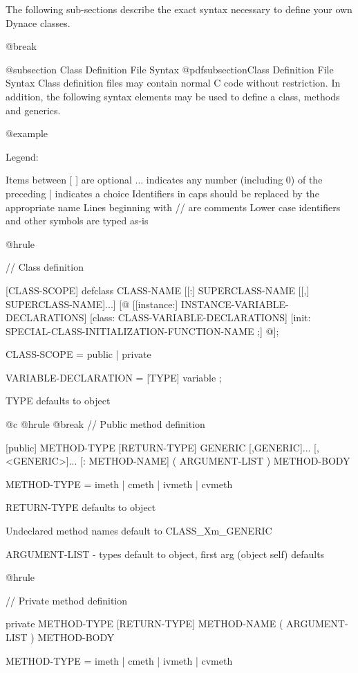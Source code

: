The following sub-sections describe the exact syntax
necessary to define your own Dynace classes.

@break

@subsection Class Definition File Syntax
@pdfsubsection{Class Definition File Syntax}
Class definition files may contain normal C code without restriction.
In addition, the following syntax elements may be used to define a class,
methods and generics.


@example

Legend:

        Items between [ ] are optional
        ... indicates any number (including 0) of the preceding
        | indicates a choice
        Identifiers in caps should be replaced by the appropriate name
        Lines beginning with // are comments
        Lower case identifiers and other symbols are typed as-is

@hrule

// Class definition

[CLASS-SCOPE]  defclass  CLASS-NAME
        [[:]  SUPERCLASS-NAME  [[,] SUPERCLASS-NAME]...]
[@{
        [[instance:]
                INSTANCE-VARIABLE-DECLARATIONS]
        [class:
                CLASS-VARIABLE-DECLARATIONS]
        [init:
                SPECIAL-CLASS-INITIALIZATION-FUNCTION-NAME ;]
@}];


CLASS-SCOPE = public | private

VARIABLE-DECLARATION = [TYPE]  variable ;

TYPE defaults to object

@c @hrule
@break
//  Public method definition 

[public]  METHOD-TYPE [RETURN-TYPE]  GENERIC [,GENERIC]...
        [,<GENERIC>]... [: METHOD-NAME]  ( ARGUMENT-LIST )
{
        METHOD-BODY
}

METHOD-TYPE = imeth | cmeth | ivmeth | cvmeth

RETURN-TYPE defaults to object

Undeclared method names default to CLASS_Xm_GENERIC

ARGUMENT-LIST - types default to object,
                first arg (object self) defaults

@hrule

//  Private method definition 

private METHOD-TYPE [RETURN-TYPE]  METHOD-NAME
        ( ARGUMENT-LIST )
{
        METHOD-BODY
}

METHOD-TYPE = imeth | cmeth | ivmeth | cvmeth

